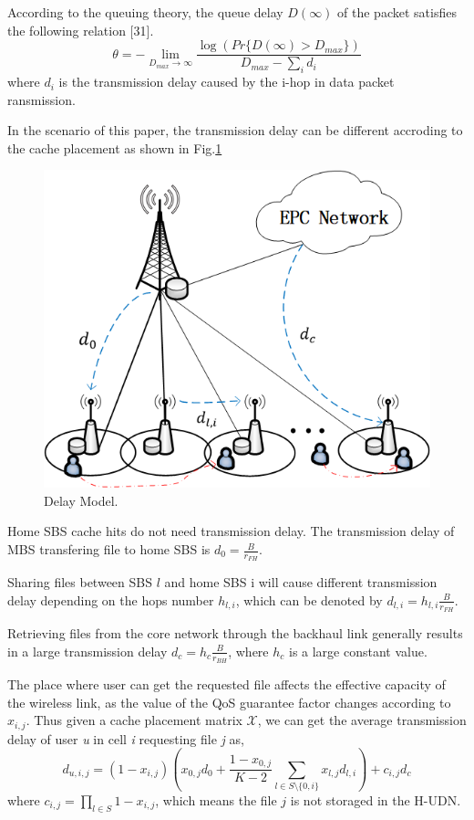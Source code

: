 \documentclass[conference]{IEEEtran}
\begin{document}
According to the queuing theory, the queue delay $D(\infty)$ of the packet satisfies the following relation [31].
\begin{equation}
\theta=-\lim_{D_{max}\to \infty}\frac{\log(Pr\{D(\infty)>D_{max}\})}{D_{max}-\sum_i d_i}
\end{equation}
where $d_i$ is the transmission delay caused by the i-hop in data packet ransmission.

In the scenario of this paper, the transmission delay can be different accroding to the cache placement as shown in Fig.\ref{fig 2}
\begin{figure}[htbp]
 \centerline{\includegraphics[scale=0.7]{fig2.png}}
 \caption{Delay Model.}
 \label{fig 2}
\end{figure}

Home SBS cache hits do not need transmission delay. The transmission delay of MBS transfering file to home SBS is $d_0=\frac{B}{r_{FH}}$.

 Sharing files between SBS $l$ and home SBS i will cause different transmission delay depending on the hops number $h_{l,i}$, which can be denoted by $d_{l,i}=h_{l,i}\frac{B}{r_{FH}}$.

Retrieving files from the core network through the backhaul link generally results in a large transmission delay $d_c=h_c\frac{B}{r_{BH}}$, where $h_c$ is a large constant value.

The place where user can get the requested file affects the effective capacity of the wireless link, as the value of the QoS guarantee factor changes according to $x_{i,j}$. Thus given a cache placement matrix $\mathcal{X}$, we can get the average transmission delay of user \emph{u} in cell \emph{i} requesting file \emph{j} as,
\begin{equation}
d_{u,i,j}=(1-x_{i,j})(x_{0,j}d_0+\frac{1-x_{0,j}}{K-2}\sum_{l\in S\setminus{\{0,i\}}}x_{l,j}d_{l,i})+c_{i,j}d_c
\end{equation}
where $c_{i,j}= \prod_{l\in S}1-x_{i,j}$, which means the file $j$ is not storaged in the H-UDN.
\end{document}
